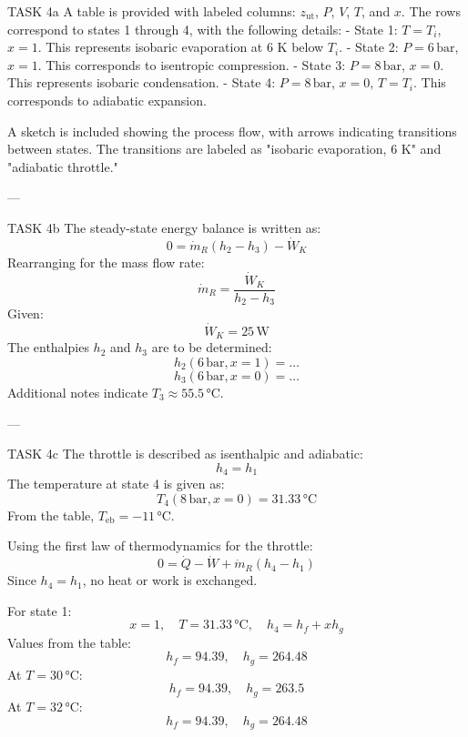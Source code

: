 TASK 4a  
A table is provided with labeled columns: \( z_{\text{ut}} \), \( P \), \( V \), \( T \), and \( x \). The rows correspond to states 1 through 4, with the following details:  
- State 1: \( T = T_i \), \( x = 1 \). This represents isobaric evaporation at 6 K below \( T_i \).  
- State 2: \( P = 6 \, \text{bar} \), \( x = 1 \). This corresponds to isentropic compression.  
- State 3: \( P = 8 \, \text{bar} \), \( x = 0 \). This represents isobaric condensation.  
- State 4: \( P = 8 \, \text{bar} \), \( x = 0 \), \( T = T_i \). This corresponds to adiabatic expansion.  

A sketch is included showing the process flow, with arrows indicating transitions between states. The transitions are labeled as "isobaric evaporation, 6 K" and "adiabatic throttle."

---

TASK 4b  
The steady-state energy balance is written as:  
\[
0 = \dot{m}_R \left( h_2 - h_3 \right) - \dot{W}_K
\]  
Rearranging for the mass flow rate:  
\[
\dot{m}_R = \frac{\dot{W}_K}{h_2 - h_3}
\]  
Given:  
\[
\dot{W}_K = 25 \, \text{W}
\]  
The enthalpies \( h_2 \) and \( h_3 \) are to be determined:  
\[
h_2 (6 \, \text{bar}, x = 1) = \ldots  
\]  
\[
h_3 (6 \, \text{bar}, x = 0) = \ldots  
\]  
Additional notes indicate \( T_3 \approx 55.5 \, \text{°C} \).

---

TASK 4c  
The throttle is described as isenthalpic and adiabatic:  
\[
h_4 = h_1
\]  
The temperature at state 4 is given as:  
\[
T_4 (8 \, \text{bar}, x = 0) = 31.33 \, \text{°C}
\]  
From the table, \( T_{\text{eb}} = -11 \, \text{°C} \).

Using the first law of thermodynamics for the throttle:  
\[
0 = \dot{Q} - \dot{W} + \dot{m}_R \left( h_4 - h_1 \right)
\]  
Since \( h_4 = h_1 \), no heat or work is exchanged.

For state 1:  
\[
x = 1, \quad T = 31.33 \, \text{°C}, \quad h_4 = h_f + x h_g
\]  
Values from the table:  
\[
h_f = 94.39, \quad h_g = 264.48
\]  
At \( T = 30 \, \text{°C} \):  
\[
h_f = 94.39, \quad h_g = 263.5
\]  
At \( T = 32 \, \text{°C} \):  
\[
h_f = 94.39, \quad h_g = 264.48
\]